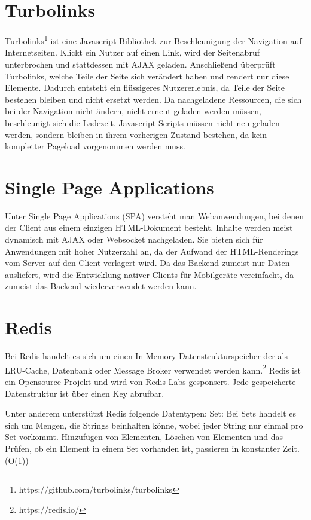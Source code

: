 \section{Turbolinks}
Turbolinks\footnote{https://github.com/turbolinks/turbolinks} ist eine Javascript-Bibliothek zur Beschleunigung der Navigation auf Internetseiten. Klickt ein Nutzer auf einen Link, wird der Seitenabruf unterbrochen und stattdessen mit AJAX geladen. Anschließend überprüft Turbolinks, welche Teile der Seite sich verändert haben und rendert nur diese Elemente. Dadurch entsteht ein flüssigeres Nutzererlebnis, da Teile der Seite bestehen bleiben und nicht ersetzt werden. Da nachgeladene Ressourcen, die sich bei der Navigation nicht ändern, nicht erneut geladen werden müssen, beschleunigt sich die Ladezeit. Javascript-Scripts müssen nicht neu geladen werden, sondern bleiben in ihrem vorherigen Zustand bestehen, da kein kompletter Pageload vorgenommen werden muss.

\section{Single Page Applications}

Unter Single Page Applications (SPA) versteht man Webanwendungen, bei denen der Client aus einem einzigen HTML-Dokument besteht.\cite{spa-def} Inhalte werden meist dynamisch mit AJAX oder Websocket nachgeladen. Sie bieten sich für Anwendungen mit hoher Nutzerzahl an, da der Aufwand der HTML-Renderings vom Server auf den Client verlagert wird. Da das Backend zumeist nur Daten ausliefert, wird die Entwicklung nativer Clients für Mobilgeräte vereinfacht, da zumeist das Backend wiederverwendet werden kann.

\section{Redis}
Bei Redis handelt es sich um einen In-Memory-Datenstrukturspeicher der als LRU-Cache, Datenbank oder Message Broker verwendet werden kann.\footnote{https://redis.io/} Redis ist ein Opensource-Projekt und  wird von Redis Labs gesponsert. Jede gespeicherte Datenstruktur ist über einen Key abrufbar.

Unter anderem unterstützt Redis folgende Datentypen:
Set:
Bei Sets handelt es sich um Mengen, die Strings beinhalten könne, wobei jeder String nur einmal pro Set vorkommt. Hinzufügen von Elementen, Löschen von Elementen und das Prüfen, ob ein Element in einem Set vorhanden ist, passieren in konstanter Zeit. (O(1))

